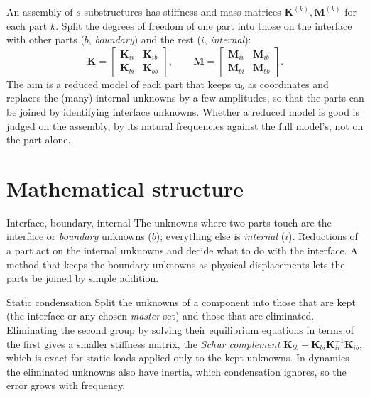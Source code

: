 An assembly of $s$ substructures has stiffness and mass matrices $\bm K^{(k)},\bm M^{(k)}$ for each part $k$. Split the degrees of freedom of one part into those on the interface with other parts ($b$, \emph{boundary}) and the rest ($i$, \emph{internal}):
\begin{equation}\label{eq:cm-split}
\bm K=\begin{bmatrix}\bm K_{ii}&\bm K_{ib}\\\bm K_{bi}&\bm K_{bb}\end{bmatrix},\qquad
\bm M=\begin{bmatrix}\bm M_{ii}&\bm M_{ib}\\\bm M_{bi}&\bm M_{bb}\end{bmatrix}.
\end{equation}
The aim is a reduced model of each part that keeps $\bm u_b$ as coordinates and replaces the (many) internal unknowns by a few amplitudes, so that the parts can be joined by identifying interface unknowns. Whether a reduced model is good is judged on the assembly, by its natural frequencies against the full model's, not on the part alone.

\section{Mathematical structure}\label{sec:cm-math}

\begin{sidenote}{Interface, boundary, internal}
The unknowns where two parts touch are the interface or \emph{boundary} unknowns ($b$); everything else is \emph{internal} ($i$). Reductions of a part act on the internal unknowns and decide what to do with the interface. A method that keeps the boundary unknowns as physical displacements lets the parts be joined by simple addition.
\end{sidenote}

\begin{sidenote}{Static condensation}
Split the unknowns of a component into those that are kept (the interface or any chosen \emph{master} set) and those that are eliminated. Eliminating the second group by solving their equilibrium equations in terms of the first gives a smaller stiffness matrix, the \emph{Schur complement} $\bm K_{bb}-\bm K_{bi}\bm K_{ii}^{-1}\bm K_{ib}$, which is exact for static loads applied only to the kept unknowns. In dynamics the eliminated unknowns also have inertia, which condensation ignores, so the error grows with frequency.
\end{sidenote}


